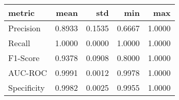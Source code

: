 \begin{tabular}{lrrrr}
\toprule
metric & mean & std & min & max \\
\midrule
Precision & 0.8933 & 0.1535 & 0.6667 & 1.0000 \\
Recall & 1.0000 & 0.0000 & 1.0000 & 1.0000 \\
F1-Score & 0.9378 & 0.0908 & 0.8000 & 1.0000 \\
AUC-ROC & 0.9991 & 0.0012 & 0.9978 & 1.0000 \\
Specificity & 0.9982 & 0.0025 & 0.9955 & 1.0000 \\
\bottomrule
\end{tabular}

